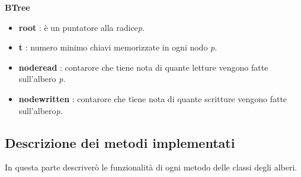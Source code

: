 \item \textbf{BTree}
    \begin{itemize}
        \item \textbf{root} : è un puntatore alla radice\textit{p}.
        \item \textbf{t} : numero minimo chiavi memorizzate in ogni nodo \textit{p}.
        \item \textbf{node\textunderscore read} : contarore che tiene nota di quante letture vengono fatte sull'albero \textit{p}.
        \item \textbf{node\textunderscore written} : contarore che tiene nota di quante scritture vengono fatte sull'albero\textit{p}.
    \end{itemize}

\subsection{Descrizione dei metodi implementati}
\label{sec:DescrizioneMetodiImplementati_1}
In questa parte descriverò le funzionalità di ogni metodo delle classi degli alberi.

